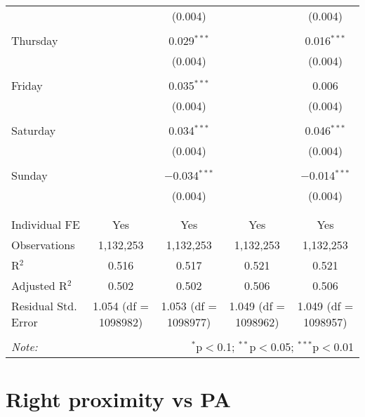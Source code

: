 \documentclass[
]{article}
\begin{document}
\begin{table}[!htbp]
{\begin{tabular}{@{\extracolsep{5pt}}lcccc}
  &  & (0.004) &  & (0.004) \\ 
  & & & & \\ 
 Thursday &  & 0.029$^{***}$ &  & 0.016$^{***}$ \\ 
  &  & (0.004) &  & (0.004) \\ 
  & & & & \\ 
 Friday &  & 0.035$^{***}$ &  & 0.006 \\ 
  &  & (0.004) &  & (0.004) \\ 
  & & & & \\ 
 Saturday &  & 0.034$^{***}$ &  & 0.046$^{***}$ \\ 
  &  & (0.004) &  & (0.004) \\ 
  & & & & \\ 
 Sunday &  & $-$0.034$^{***}$ &  & $-$0.014$^{***}$ \\ 
  &  & (0.004) &  & (0.004) \\ 
  & & & & \\ 
\hline \\[-1.8ex] 
Individual FE & Yes & Yes & Yes & Yes \\ 
Observations & 1,132,253 & 1,132,253 & 1,132,253 & 1,132,253 \\ 
R$^{2}$ & 0.516 & 0.517 & 0.521 & 0.521 \\ 
Adjusted R$^{2}$ & 0.502 & 0.502 & 0.506 & 0.506 \\ 
Residual Std. Error & 1.054 (df = 1098982) & 1.053 (df = 1098977) & 1.049 (df = 1098962) & 1.049 (df = 1098957) \\ 
\hline 
\hline \\[-1.8ex] 
\textit{Note:}  & \multicolumn{4}{r}{$^{*}$p$<$0.1; $^{**}$p$<$0.05; $^{***}$p$<$0.01} \\ 
\end{tabular}
} 
\end{table} 
\newpage
\section{Right proximity vs PA}
\end{document}
